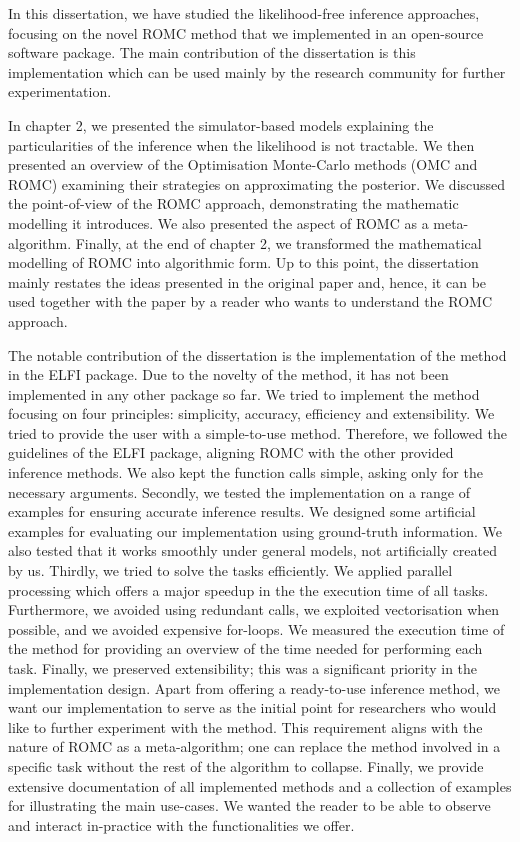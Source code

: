 In this dissertation, we have studied the likelihood-free inference
approaches, focusing on the novel ROMC method that we implemented in
an open-source software package. The main contribution of the
dissertation is this implementation which can be used mainly by the
research community for further experimentation.

In chapter 2, we presented the simulator-based models explaining the
particularities of the inference when the likelihood is not
tractable. We then presented an overview of the Optimisation
Monte-Carlo methods (OMC and ROMC) examining their strategies on
approximating the posterior. We discussed the point-of-view of the
ROMC approach, demonstrating the mathematic modelling it
introduces. We also presented the aspect of ROMC as a
meta-algorithm. Finally, at the end of chapter 2, we transformed the
mathematical modelling of ROMC into algorithmic form. Up to this
point, the dissertation mainly restates the ideas presented in the
original paper \autocite{Ikonomov2019} and, hence, it can be used
together with the paper by a reader who wants to understand the ROMC
approach.

The notable contribution of the dissertation is the implementation of
the method in the ELFI package. Due to the novelty of the method, it
has not been implemented in any other package so far. We tried to
implement the method focusing on four principles: simplicity,
accuracy, efficiency and extensibility. We tried to provide the user
with a simple-to-use method. Therefore, we followed the guidelines of
the ELFI package, aligning ROMC with the other provided inference methods. We
also kept the function calls simple, asking only for the necessary
arguments. Secondly, we tested the implementation on a range of
examples for ensuring accurate inference results. We designed some
artificial examples for evaluating our implementation using
ground-truth information. We also tested that it works smoothly under
general models, not artificially created by us. Thirdly, we tried to
solve the tasks efficiently. We applied parallel processing which offers a major speedup in the the execution time of all tasks. Furthermore, we avoided using redundant calls, we
exploited vectorisation when possible, and we avoided expensive
for-loops.  We measured the execution time of the method for providing
an overview of the time needed for performing each task. Finally, we
preserved extensibility; this was a significant priority in the
implementation design. Apart from offering a ready-to-use inference
method, we want our implementation to serve as the initial point for
researchers who would like to further experiment with the method. This
requirement aligns with the nature of ROMC as a meta-algorithm; one
can replace the method involved in a specific task without the rest of
the algorithm to collapse. Finally, we provide extensive documentation
of all implemented methods and a collection of examples for
illustrating the main use-cases. We wanted the reader to be able to
observe and interact in-practice with the functionalities we offer.